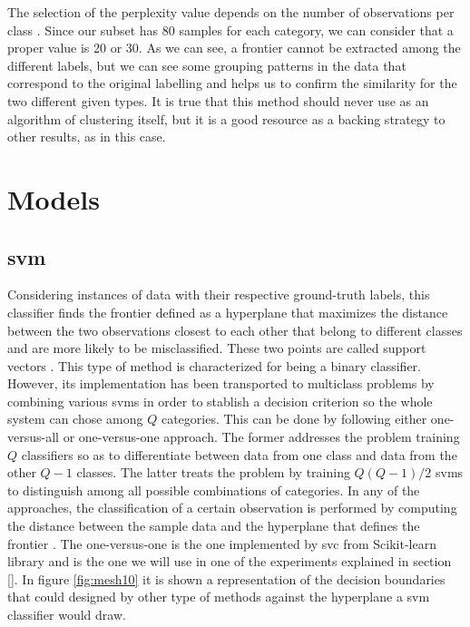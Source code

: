 	The selection of the perplexity value depends on the number of observations per class \cite{Wattenberg2016}. Since our subset has 80 samples for each category, we can consider that a proper value is 20 or 30. As we can see, a frontier cannot be extracted among the different labels, but we can see some grouping patterns in the data that correspond to the original labelling and helps us to confirm the similarity for the two different given types. It is true that this method should never use as an algorithm of clustering itself, but it is a good resource as a backing strategy to other results, as in this case. 
	
\section{Models}
\label{section:models}


\subsection{\acrfull{svm}}
\label{subsection:svm}

	Considering instances of data with their respective ground-truth labels, this classifier finds the frontier defined as a hyperplane that maximizes the distance between the two observations closest to each other that belong to different classes and are more likely to be misclassified. These two points are called support vectors \cite{Fu2011}. This type of method is characterized for being a binary classifier. However, its implementation has been transported to multiclass problems by combining various \acrshort{svm}s in order to stablish a decision criterion so the whole system can chose among $Q$ categories. This can be done by following either one-versus-all or one-versus-one approach. The former addresses the problem training $Q$ classifiers so as to differentiate between data from one class and data from the other $Q-1$ classes. The latter treats the problem by training $Q(Q-1)/2$ \acrshort{svm}s to distinguish among all possible combinations of categories. In any of the approaches, the classification of a certain observation is performed by computing the distance between the sample data and the hyperplane that defines the frontier \cite{Barchiesi2015}. The one-versus-one is the one implemented by \acrfull{svc} from Scikit-learn library and is the one we will use in one of the experiments explained in section \ref{}. In figure \ref{fig:mesh10} it is shown a representation of the decision boundaries that could designed by other type of methods against the hyperplane a \acrshort{svm} classifier would draw.
	
